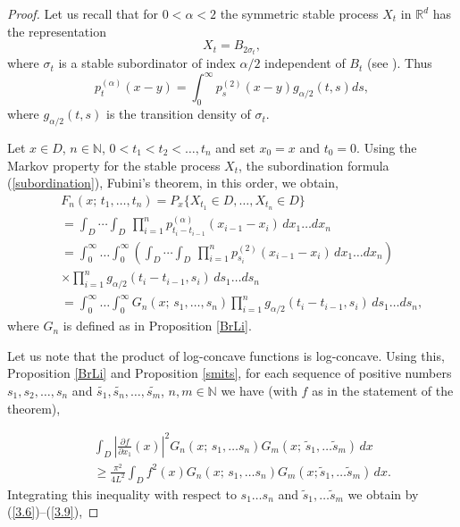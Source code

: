\documentclass[11pt,leqno]{article}
\theoremstyle{definition}
\newcommand{\R}{\mathbb{R}}
\newcommand{\N}{\mathbb{N}}
\numberwithin{equation}{section}
\begin{document}
\begin{proof}
Let us recall that for  $ 0< \alpha
<2$ the symmetric stable process $X_t$ in $\R^d$ has the representation
\begin{equation}X_t = B_{2\sigma_t},
\end{equation}
where $\sigma_t$ is a  stable subordinator of index $\alpha /2$
independent of $B_t$ (see \cite{BG1}). Thus
\begin{equation}\label{subordination}
p_t^{(\alpha)}(x-y)= \int_0^{\infty} p_s^{(2)}(x-y)
g_{\alpha/2}(t,s)ds,
\end{equation} where $ g_{\alpha/2}(t,s)$ is the
transition density of $\sigma_t$. 


Let $x \in D$, $n \in \N$, $0<t_1<t_2 <\dots, t_n$ and set $x_0=x$ and
$t_0=0$.  Using the Markov property for the stable process $X_t$, the subordination
formula (\ref{subordination}), Fubini's theorem, in this order, we obtain,
\begin{eqnarray}
&& F_n(x; \,  t_1, \dots, t_n)=P_x\{X_{t_1}\in D, \dots, X_{t_n}\in
D\}\label{3.6}\\ && = \int_D\cdots\int_D\, \prod_{i=1}^n
p^{(\alpha)}_{t_i-t_{i-1}}(x_{i-1}-x_{i})\,dx_1\ldots
dx_n\nonumber\\ && =\int_0^{\infty}\ldots\int_0^{\infty}\left(
\int_D\cdots\int_D\, \prod_{i=1}^n
p_{s_i}^{(2)}(x_{i-1}-x_{i})\,dx_1\ldots dx_n\right)\\ &&\times
\prod_{i=1}^{n}g_{\alpha/2}(t_i-t_{i-1},s_i)\,ds_1\ldots ds_n\\
&& = \int_0^{\infty}\ldots\int_0^{\infty}G_n(x; \, s_1, \dots, s_n)
\prod_{i=1}^{n}g_{\alpha/2}(t_i-t_{i-1},s_i)\,ds_1\ldots ds_n\label{3.9},
\end{eqnarray}
where $G_n$ is defined as in Proposition \ref{BrLi}.

Let us note that the product of log-concave functions is log-concave.
Using this, Proposition \ref{BrLi} and Proposition \ref{smits}, for each sequence of positive numbers $s_1,
s_2, \dots, s_n$ and $\tilde{s_1}, \tilde{s_n}, \dots, \tilde{s_m}$, $n,m \in \N$  we have (with $f$ as in the statement of the
theorem),
 
\begin{eqnarray*}
&&\int_{D} \left| \frac{\partial f}{\partial x_1} (x) \right|^{2} G_n(x; \, s_1, \dots s_n)G_m(x; \, \tilde
s_1,
\dots\tilde  s_m)
\, dx\\
&& \ge 
\frac{\pi^{2}}{4 L^{2}} 
 \int_{D} f^{2}(x) G_n(x;  \, s_1, \dots s_n)G_m(x; \tilde s_1,
\dots\tilde  s_m)\, dx.
\end{eqnarray*}
Integrating this inequality with respect to $s_1\dots s_n$ and $\tilde s_1, \dots \tilde s_m$ we obtain by 
(\ref{3.6})--(\ref{3.9}), 


\end{proof}
\end{document}
